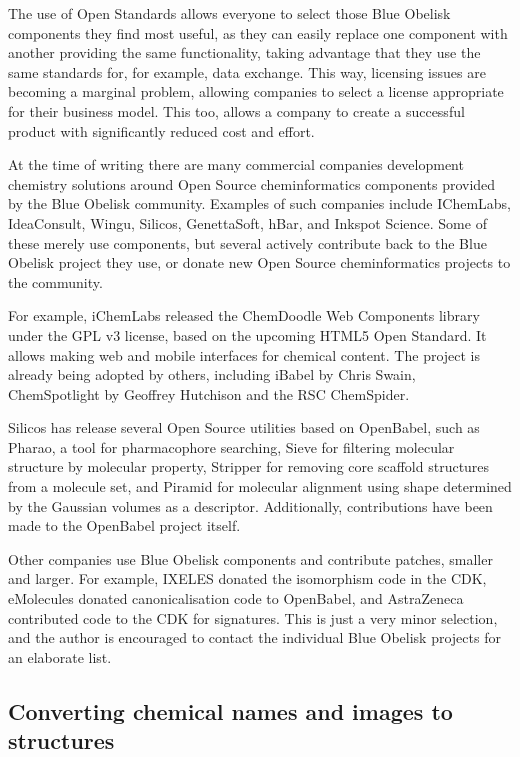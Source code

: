 \documentclass[10pt]{bmc_article}
\newenvironment{bmcformat}{\fussy\setboolean{publ}{true}}{\fussy}
\begin{document}
\begin{bmcformat}
The use of Open Standards allows everyone to select those Blue Obelisk components
they find most useful, as they can easily replace one component with another providing
the same functionality, taking advantage that they use the same standards for,
for example, data exchange. This way, licensing issues are becoming a marginal
problem, allowing companies to select a license appropriate for their business
model. This too, allows a company to create a successful product with significantly
reduced cost and effort.

At the time of writing there are many commercial companies development chemistry
solutions around Open Source cheminformatics components provided by the Blue Obelisk
community. Examples of such companies include IChemLabs, IdeaConsult, Wingu, Silicos,
GenettaSoft, hBar, and Inkspot Science. Some of these merely use components, but several
actively contribute back to the Blue Obelisk project they use, or donate new
Open Source cheminformatics projects to the community.

For example, iChemLabs released the ChemDoodle Web Components library under the GPL v3
license, based on the upcoming HTML5 Open Standard. It allows making web and mobile
interfaces for chemical content. The project is already being adopted by others,
including iBabel by Chris Swain\cite{iBabel}, ChemSpotlight by
Geoffrey Hutchison\cite{chemspotlight} and the RSC ChemSpider\cite{chemspider_chemdoodle}.

Silicos has release several Open Source utilities based on
OpenBabel, such as Pharao, a tool for pharmacophore searching,
Sieve for filtering molecular structure by molecular property,
Stripper for removing core scaffold structures from a molecule
set, and Piramid for molecular alignment using shape determined
by the Gaussian volumes as a descriptor. Additionally,
contributions have been made to the OpenBabel project itself.

Other companies use Blue Obelisk components and contribute patches,
smaller and larger. For example, IXELES donated the isomorphism
code in the CDK, eMolecules donated canonicalisation code to
OpenBabel, and AstraZeneca contributed code to the CDK for
signatures. This is just a very minor selection, and the author
is encouraged to contact the individual Blue Obelisk projects
for an elaborate list.

\subsection*{Converting chemical names and images to structures}


\end{bmcformat}
\end{document}
